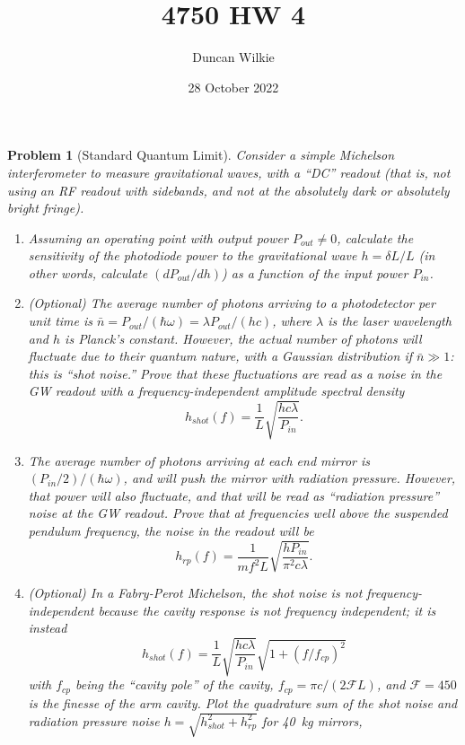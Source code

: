 \documentclass{article}
\title{4750 HW 4}
\author{Duncan Wilkie}
\date{28 October 2022}
\newtheorem{plm}{Problem}
\begin{document}
\maketitle

\begin{plm}[Standard Quantum Limit]
  Consider a simple Michelson interferometer to measure gravitational waves, with a ``DC'' readout (that is, not using an RF readout with sidebands,
  and not at the absolutely dark or absolutely bright fringe).
  \begin{enumerate}
  \item Assuming an operating point with output power $P_{out} \neq 0$, calculate the sensitivity of the photodiode power to the gravitational wave
    $h = \delta L / L$ (in other words, calculate $(dP_{out}/dh)$) as a function of the input power $P_{in}$.
  \item (Optional) The average number of photons arriving to a photodetector per unit time is $\bar{n} = P_{out} / (\hbar\omega) = \lambda P_{out} / (hc)$,
    where $\lambda$ is the laser wavelength and $h$ is Planck's constant.
    However, the actual number of photons will fluctuate due to their quantum nature, with a Gaussian distribution if $\bar{n}\gg 1$: this is ``shot noise.''
    Prove that these fluctuations are read as a noise in the GW readout with a frequency-independent amplitude spectral density
    \[
      h_{shot}(f) = \frac{1}{L}\sqrt{\frac{hc\lambda}{P_{in}}}.
    \]
  \item The average number of photons arriving at each end mirror is $(P_{in} / 2)/(\hbar\omega)$, and will push the mirror with radiation pressure.
    However, that power will also fluctuate, and that will be read as ``radiation pressure'' noise at the GW readout.
    Prove that at frequencies well above the suspended pendulum frequency, the noise in the readout will be
    \[
      h_{rp}(f) = \frac{1}{mf^{2}L}\sqrt{\frac{hP_{in}}{\pi^{2}c\lambda}}.
    \]
  \item (Optional) In a Fabry-Perot Michelson, the shot noise is not frequency-independent because the cavity response is not frequency independent;
    it is instead
    \[
      h_{shot}(f)  = \frac{1}{L}\sqrt{\frac{hc\lambda}{P_{in}}}\sqrt{1 + (f / f_{cp})^{2}}
    \]
    with $f_{cp}$ being the ``cavity pole'' of the cavity, $f_{cp} = \pi c / (2\mathcal{F}L)$, and $\mathcal{F} = 450$ is the finesse of the arm cavity.
    Plot the quadrature sum of the shot noise and radiation pressure noise $h = \sqrt{h_{shot}^{2} + h_{rp}^{2}}$ for \SI{40}{kg} mirrors,

\end{enumerate}
\end{plm}
\end{document}
